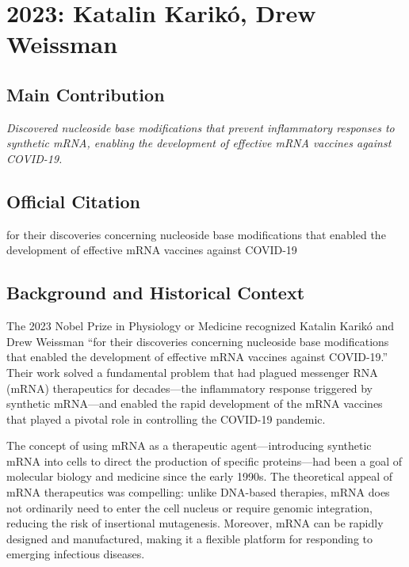 \chapter[2023 --- Kariko et al.]{2023: Katalin Karik\'o, Drew Weissman}
\label{ch:2023_Kariko}

\section*{Main Contribution}

\textit{Discovered nucleoside base modifications that prevent inflammatory responses to synthetic mRNA, enabling the development of effective mRNA vaccines against COVID-19.}\cite{nobel-2023,lecture-2023}

\section{Official Citation}

for their discoveries concerning nucleoside base modifications that enabled the development of effective mRNA vaccines against COVID-19

\section{Background and Historical Context}

The 2023 Nobel Prize in Physiology or Medicine recognized Katalin Karik\'o and Drew Weissman ``for their discoveries concerning nucleoside base modifications that enabled the development of effective mRNA vaccines against COVID-19.'' Their work solved a fundamental problem that had plagued messenger RNA (mRNA) therapeutics for decades---the inflammatory response triggered by synthetic mRNA---and enabled the rapid development of the mRNA vaccines that played a pivotal role in controlling the COVID-19 pandemic.

The concept of using mRNA as a therapeutic agent---introducing synthetic mRNA into cells to direct the production of specific proteins---had been a goal of molecular biology and medicine since the early 1990s. The theoretical appeal of mRNA therapeutics was compelling: unlike DNA-based therapies, mRNA does not ordinarily need to enter the cell nucleus or require genomic integration, reducing the risk of insertional mutagenesis. Moreover, mRNA can be rapidly designed and manufactured, making it a flexible platform for responding to emerging infectious diseases.

